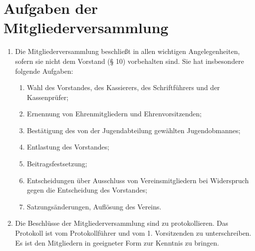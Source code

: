 \documentclass[10pt, twocolumn, parskip=half]{scrartcl}
\begin{document}
\section{Aufgaben der Mitgliederversammlung}
\begin{enumerate}[noitemsep]
	\item Die Mitgliederversammlung beschließt in allen wichtigen Angelegenheiten, sofern sie nicht dem Vorstand (§ 10) vorbehalten sind. Sie hat insbesondere folgende Aufgaben:
	\begin{enumerate}[noitemsep]
		\item Wahl des Vorstandes, des Kassierers, des Schriftführers und der Kassenprüfer;
		\item Ernennung von Ehrenmitgliedern und Ehrenvorsitzenden;
		\item Bestätigung des von der Jugendabteilung gewählten Jugendobmannes;
		\item Entlastung des Vorstandes;
		\item Beitragsfestsetzung;
		\item Entscheidungen über Ausschluss von Vereinsmitgliedern bei Widerspruch gegen die Entscheidung des Vorstandes;
		\item Satzungsänderungen, Auflösung des Vereins.
	\end{enumerate}
	\item Die Beschlüsse der Mitgliederversammlung sind zu protokollieren. Das Protokoll ist vom Protokollführer und vom 1. Vorsitzenden zu unterschreiben. Es ist den Mitgliedern in geeigneter Form zur Kenntnis zu bringen.
\end{enumerate}
\end{document}
